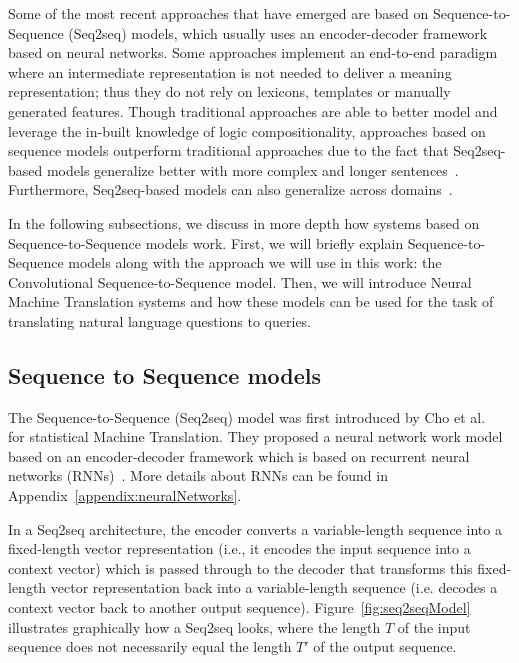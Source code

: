 Some of the most recent approaches that have emerged are based on Sequence-to-Sequence (Seq2seq) 
models, which usually uses an encoder-decoder framework based on neural networks. Some 
approaches implement an end-to-end paradigm where an intermediate representation is not 
needed to deliver a meaning representation; thus they do not rely on lexicons, templates or 
manually generated features. Though traditional approaches are able to better model and 
leverage the in-built knowledge of logic compositionality, approaches based on sequence 
models outperform traditional approaches due to the fact that Seq2seq-based models generalize 
better with more complex and longer sentences~\cite{semPar:JiaL16}. Furthermore, Seq2seq-based 
models can also generalize across domains~\cite{semPar:KamathD19}.

In the following subsections, we discuss in more depth how systems based on 
Sequence-to-Sequence models work. First, we will briefly explain Sequence-to-Sequence models 
along with the approach we will use in this work: the Convolutional Sequence-to-Sequence model. 
Then, we will introduce Neural Machine Translation systems and how these models can be used 
for the task of translating natural language questions to \SPARQL{} queries.

\subsection{Sequence to Sequence models}
\label{cap2:theoFrame/semPar/seq2seq}
The Sequence-to-Sequence (Seq2seq) model was first introduced by 
Cho et al.~\cite{seqlab:ChoMBB14} for statistical Machine Translation. 
They proposed a neural network work model based on an encoder-decoder framework 
which is based on recurrent neural networks 
(RNNs)~\cite{semPar:werbos1990, semPar:rumelhart1986,seqlab:HochreiterS97}. More details 
about RNNs can be found in Appendix~\ref{appendix:neuralNetworks}.

In a Seq2seq architecture, the encoder converts a variable-length sequence into a fixed-length 
vector representation (i.e., it encodes the input sequence into a context vector) which is 
passed through to the decoder that transforms this fixed-length vector representation back 
into a variable-length sequence (i.e. decodes a context vector back to another output 
sequence). Figure~\ref{fig:seq2seqModel} illustrates graphically how a Seq2seq looks, where 
the length $T$ of the input sequence does not necessarily equal the length $T'$ of the output 
sequence.

